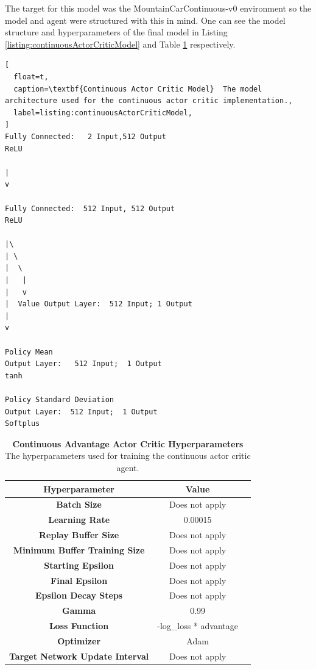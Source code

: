\documentclass[conference]{IEEEtran}
\begin{document}
The target for this model was the MountainCarContinuous-v0 environment so the model and agent were structured with this in mind.
One can see the model structure and hyperparameters of the final model in Listing \ref{listing:continuousActorCriticModel} and Table \ref{table:continuousActorCriticHypers} respectively.


\begin{lstlisting}[
  float=t,
  caption=\textbf{Continuous Actor Critic Model}  The model architecture used for the continuous actor critic implementation.,
  label=listing:continuousActorCriticModel,
]
Fully Connected:   2 Input,512 Output
ReLU

|
v

Fully Connected:  512 Input, 512 Output  
ReLU

|\
| \
|  \
|   |
|   v
|  Value Output Layer:  512 Input; 1 Output
|
v

Policy Mean 
Output Layer:   512 Input;  1 Output
tanh

Policy Standard Deviation 
Output Layer:  512 Input;  1 Output
Softplus
\end{lstlisting}

\begin{table}[htbp]
    \caption{\textbf{Continuous Advantage Actor Critic Hyperparameters}  The hyperparameters used for training the continuous actor critic agent.}
\begin{center}
\begin{tabular}{|c|c|c|}
\hline
\textbf{Hyperparameter} & \textbf{Value} \\
\hline
\textbf{Batch Size} & Does not apply \\
\hline
\textbf{Learning Rate} & 0.00015 \\
\hline
\textbf{Replay Buffer Size} & Does not apply \\
\hline
\textbf{Minimum Buffer Training Size} & Does not apply \\
\hline
\textbf{Starting Epsilon} & Does not apply \\
\hline
\textbf{Final Epsilon} & Does not apply \\
\hline
\textbf{Epsilon Decay Steps} & Does not apply \\
\hline
\textbf{Gamma} & 0.99\\
\hline
\textbf{Loss Function} &  -log\_loss * advantage \\
\hline
\textbf{Optimizer} & Adam \\
\hline
\textbf{Target Network Update Interval} & Does not apply \\
\hline
\end{tabular}
\label{table:continuousActorCriticHypers}
\end{center}
\end{table}
\end{document}
